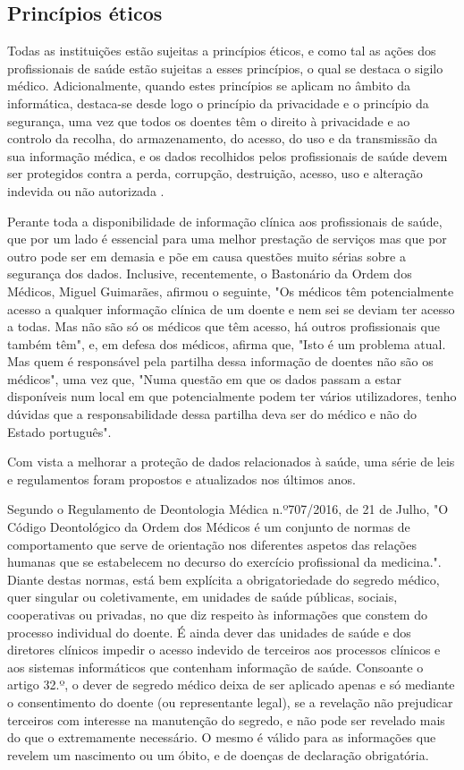 \documentclass[conference]{IEEEtran}
\begin{document}
\subsection{Princípios éticos}

Todas as instituições estão sujeitas a princípios éticos, e como tal as ações dos profissionais de saúde estão sujeitas a esses princípios, o qual se destaca o sigilo médico. Adicionalmente, quando estes princípios se aplicam no âmbito da informática, destaca-se desde logo o princípio da privacidade e o princípio da segurança, uma vez que todos os doentes têm o direito à privacidade e ao controlo da recolha, do armazenamento, do acesso, do uso e da transmissão da sua informação médica, e os dados recolhidos pelos profissionais de saúde devem ser protegidos contra a perda, corrupção, destruição, acesso, uso e alteração indevida ou não autorizada \cite{segurancaSI}.

Perante toda a disponibilidade de informação clínica aos profissionais de saúde, que por um lado é essencial para uma melhor prestação de serviços mas que por outro pode ser em demasia e põe em causa questões muito sérias sobre a segurança dos dados. Inclusive, recentemente, o Bastonário da Ordem dos Médicos, Miguel Guimarães, afirmou o seguinte, "Os médicos têm potencialmente acesso a qualquer informação clínica de um doente e nem sei se deviam ter acesso a todas. Mas não são só os médicos que têm acesso, há outros profissionais que também têm", e, em defesa dos médicos, afirma que, "Isto é um problema atual. Mas quem é responsável pela partilha dessa informação de doentes não são os médicos", uma vez que, "Numa questão em que os dados passam a estar disponíveis num local em que potencialmente podem ter vários utilizadores, tenho dúvidas que a responsabilidade dessa partilha deva ser do médico e não do Estado português".

Com vista a melhorar a proteção de dados relacionados à saúde, uma série de leis e regulamentos foram propostos e atualizados nos últimos anos.

Segundo o Regulamento de Deontologia Médica n.º707/2016, de 21 de Julho, "O Código Deontológico da Ordem dos Médicos é um conjunto de normas de comportamento que serve de orientação nos diferentes aspetos das relações humanas que se estabelecem no decurso do exercício profissional da medicina.". Diante destas normas, está bem explícita a obrigatoriedade do segredo médico, quer singular ou coletivamente, em unidades de saúde públicas, sociais, cooperativas ou privadas, no que diz respeito às informações que constem do processo individual do doente. É ainda dever das unidades de saúde e dos diretores clínicos impedir o acesso indevido de terceiros aos processos clínicos e aos sistemas informáticos que contenham informação de saúde.
Consoante o artigo 32.º, o dever de segredo médico deixa de ser aplicado apenas e só mediante o consentimento do doente (ou representante legal), se a revelação não prejudicar terceiros com interesse na manutenção do segredo, e não pode ser revelado mais do que o extremamente necessário. O mesmo é válido para as informações que revelem um nascimento ou um óbito, e de doenças de declaração obrigatória.
\end{document}
